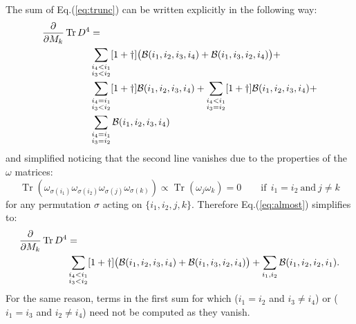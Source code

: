 \documentclass[12pt,a4paper]{article}
\DeclareMathOperator{\Tr}{Tr}
\begin{document}
The sum of Eq.(\ref{eq:trunc}) can be written explicitly in the following way:
\begin{align}\label{eq:almost}
\frac{\partial}{\partial M_k} \Tr D^4 &= \notag \\
&\sum_{\substack{i_4 < i_1 \\ i_3 < i_2}}[1+\dagger]\big(\mathcal{B}(i_1, i_2, i_3, i_4) + \mathcal{B}(i_1, i_3, i_2, i_4)\big) + \notag \\
&\sum_{\substack{i_4 = i_1 \\ i_3 < i_2}}[1+\dagger]\mathcal{B}(i_1, i_2, i_3, i_4) + \sum_{\substack{i_4 < i_1 \\ i_3 = i_2}}[1+\dagger]\mathcal{B}(i_1, i_2, i_3, i_4) + \notag \\
&\sum_{\substack{i_4 = i_1 \\ i_3 = i_2}}\mathcal{B}(i_1, i_2, i_3, i_4)
\end{align}
and simplified noticing that the second line vanishes due to the properties of the $\omega$ matrices:
\begin{equation}\label{eq:gamma0}
\Tr(\omega_{\sigma(i_1)} \omega_{\sigma(i_2)} \omega_{\sigma(j)} \omega_{\sigma(k)}) \propto \Tr(\omega_j \omega_k) = 0 \qquad \text{if} \ \ i_1 = i_2 \ \text{and} \ j \neq k
\end{equation}
for any permutation $\sigma$ acting on $\{i_1, i_2, j, k\}$.\newline
Therefore Eq.(\ref{eq:almost}) simplifies to:
\begin{align}\label{eq:notquite}
\frac{\partial}{\partial M_k} \Tr D^4 &
= \notag \\
&\sum_{\substack{i_4 < i_1 \\ i_3 < i_2}}[1+\dagger]\big(\mathcal{B}(i_1, i_2, i_3, i_4) + \mathcal{B}(i_1, i_3, i_2, i_4)\big) + \sum_{i_1, i_2}\mathcal{B}(i_1, i_2, i_2, i_1).
\end{align}
For the same reason, terms in the first sum for which ($i_1=i_2$ and $i_3 \neq i_4$) or ($i_1=i_3$ and $i_2 \neq i_4$) need not be computed as they vanish. 
\end{document}
